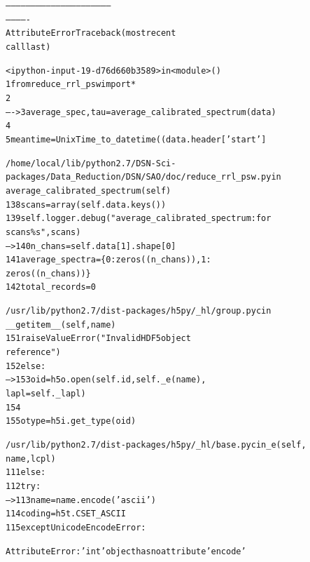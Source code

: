 \documentclass[letterpaper,10pt,english]{/usr/share/sphinx/texinputs/sphinxhowto}
\begin{document}
    

        
        

            
                
            \begin{alltt}

        --------------------------------------------------------------
-------------
    AttributeError                            Traceback (most recent
call last)



        <ipython-input-19-d76d660b3589> in <module>()
          1 from reduce\_rrl\_psw import *
          2
    ----> 3 average\_spec, tau = average\_calibrated\_spectrum(data)
          4
          5 meantime = UnixTime\_to\_datetime((data.header['start']




        /home/local/lib/python2.7/DSN-Sci-
packages/Data\_Reduction/DSN/SAO/doc/reduce\_rrl\_psw.py in
average\_calibrated\_spectrum(self)
        138     scans = array(self.data.keys())
        139     self.logger.debug("average\_calibrated\_spectrum: for
scans \%s", scans)
    --> 140     n\_chans = self.data[1].shape[0]
        141     average\_spectra = \{0: zeros((n\_chans)), 1:
zeros((n\_chans))\}
        142     total\_records = 0




        /usr/lib/python2.7/dist-packages/h5py/\_hl/group.pyc in
\_\_getitem\_\_(self, name)
        151                 raise ValueError("Invalid HDF5 object
reference")
        152         else:
    --> 153             oid = h5o.open(self.id, self.\_e(name),
lapl=self.\_lapl)
        154
        155         otype = h5i.get\_type(oid)




        /usr/lib/python2.7/dist-packages/h5py/\_hl/base.pyc in \_e(self,
name, lcpl)
        111         else:
        112             try:
    --> 113                 name = name.encode('ascii')
        114                 coding = h5t.CSET\_ASCII
        115             except UnicodeEncodeError:




        AttributeError: 'int' object has no attribute 'encode'

\end{alltt}
        
\end{document}

